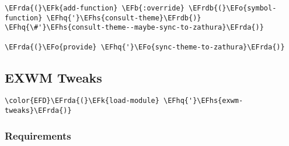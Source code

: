 \documentclass[a4wide,10pt]{article}
\newcommand{\EFk}[1]{\textcolor{EFk}{#1}} %
\newcommand{\EFb}[1]{\textcolor{EFb}{#1}} %
\newcommand{\EFo}[1]{\textcolor{EFo}{#1}} %
\newcommand{\EFhq}[1]{\textcolor{EFhq}{#1}} %
\newcommand{\EFhs}[1]{\textcolor{EFhs}{#1}} %
\newcommand{\EFrda}[1]{\textcolor{EFrda}{#1}} %
\newcommand{\EFrdb}[1]{\textcolor{EFrdb}{#1}} %
\begin{document}
\begin{Code}
\begin{Verbatim}
\EFrda{(}\EFk{add-function} \EFb{:override} \EFrdb{(}\EFo{symbol-function} \EFhq{'}\EFhs{consult-theme}\EFrdb{)} \EFhq{\#'}\EFhs{consult-theme--maybe-sync-to-zathura}\EFrda{)}

\EFrda{(}\EFo{provide} \EFhq{'}\EFo{sync-theme-to-zathura}\EFrda{)}
\end{Verbatim}
\end{Code}
\subsection{EXWM Tweaks}
\label{sec:org57ac2a1}
\begin{Code}
\begin{Verbatim}
\color{EFD}\EFrda{(}\EFk{load-module} \EFhq{'}\EFhs{exwm-tweaks}\EFrda{)}
\end{Verbatim}
\end{Code}
\subsubsection{Requirements}
\label{sec:org22846d2}
\end{document}
